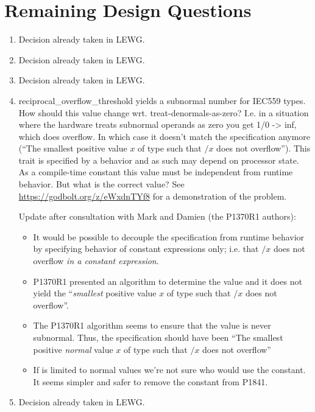 \section{Remaining Design Questions}
\begin{enumerate}
  \item Decision already taken in LEWG.

  \item Decision already taken in LEWG.

  \item Decision already taken in LEWG.

  \item reciprocal_overflow_threshold yields a subnormal number for IEC559 types.
  How should this value change wrt. treat-denormals-as-zero?
  I.e. in a situation where the hardware treats subnormal operands as zero you get 1/0 -> inf, which does overflow.
  In which case it doesn't match the specification anymore (“The smallest positive value $x$ of type  such that $/x$ does not overflow”).
  This trait is specified by a behavior and as such may depend on processor state.
  As a compile-time constant this value must be independent from runtime behavior.
  But what is the correct value?
  See \url{https://godbolt.org/z/eWxdnTYf8} for a demonstration of the problem.

  Update after consultation with Mark and Damien (the P1370R1 authors):
  \begin{itemize}
  \item It would be possible to decouple the specification from runtime behavior by specifying behavior of constant expressions only;
    i.e. that $/x$ does not overflow \emph{in a constant expression}.
  \item P1370R1 presented an algorithm to determine the value and it does not yield the “\emph{smallest} positive value $x$ of type  such that $/x$ does not overflow”.
  \item The P1370R1 algorithm seems to ensure that the value is never subnormal.
    Thus, the specification should have been “The smallest positive \emph{normal} value $x$ of type  such that $/x$ does not overflow”
  \item If  is limited to normal values we're not sure who would use the  constant.
    It seems simpler and safer to remove the constant from P1841.
  \end{itemize}

  \item Decision already taken in LEWG.
\end{enumerate}

